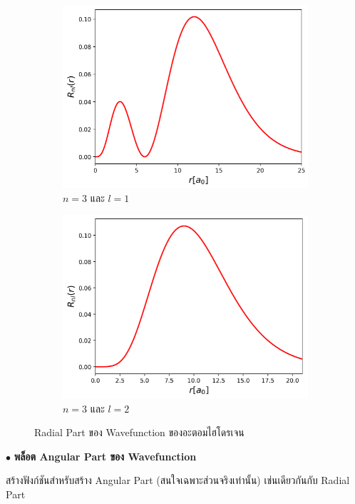 \begin{figure}[H]
\begin{subfigure}{0.5\textwidth}
        \includegraphics[width=0.9\linewidth]{fig/wfn_hydro_radial_n3_l1.png}
        \caption{$n = 3$ และ $l = 1$}
        \label{fig:wfn_hydro_radial_n3_l1}
    \end{subfigure}%
    \begin{subfigure}{0.5\textwidth}
        \centering
        \includegraphics[width=0.9\linewidth]{fig/wfn_hydro_radial_n3_l2.png}
        \caption{$n = 3$ และ $l = 2$}
        \label{fig:wfn_hydro_radial_n3_l2}
    \end{subfigure}
    \caption{Radial Part ของ Wavefunction ของอะตอมไฮโดรเจน}
    \label{fig:wfn_hydro_radial_all}
\end{figure}

\bigskip

$\bullet$ \textbf{พล็อต Angular Part ของ Wavefunction}

สร้างฟังก์ชันสำหรับสร้าง Angular Part (สนใจเฉพาะส่วนจริงเท่านั้น) เช่นเดียวกันกับ Radial Part

